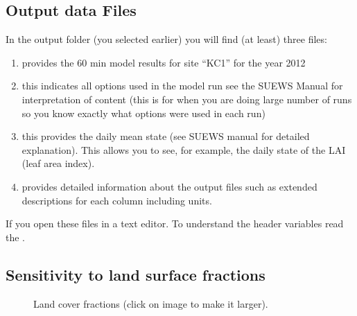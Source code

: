 \documentclass[letterpaper,10pt,english]{sphinxmanual}
\begin{document}
\subsection{Output data Files}
\label{\detokenize{Tutorials/IntroductionToSuews:output-data-files}}
In the output folder (you selected earlier) you will find (at least)
three files:
\begin{enumerate}
\item {} 
 \textendash{} provides the 60 min model results for site
“KC1” for the year 2012

\item {} 
 \textendash{} this indicates all options used in the
model run see the SUEWS Manual for interpretation of content (this is
for when you are doing large number of runs so you know exactly what
options were used in each run)

\item {} 
 \textendash{} this provides the daily mean state (see
SUEWS manual for detailed explanation). This allows you to see, for
example, the daily state of the LAI (leaf area index).

\item {} 
 \textendash{} provides detailed information about the
output files such as extended descriptions for each column including
units.

\end{enumerate}

If you open these files in a text editor. To understand the header
variables read the .


\subsection{Sensitivity to land surface fractions}
\label{\detokenize{Tutorials/IntroductionToSuews:sensitivity-to-land-surface-fractions}}\begin{wrapfigure}{r}{0pt}
\centering
\noindent{}
\caption{Land cover fractions (click on image to make it larger).}\label{\detokenize{Tutorials/IntroductionToSuews:id6}}\end{wrapfigure}
\end{document}
